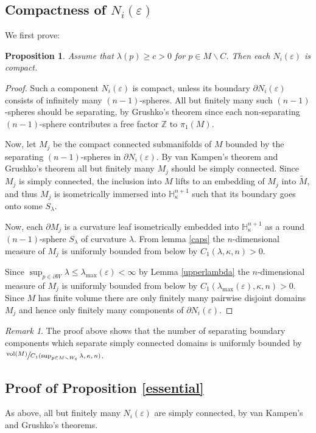 \documentclass[10pt]{amsart}
\let\moins\smallsetminus
\DeclareMathOperator{\vol}{vol}
\newtheorem{proposition}[theorem]{Proposition}
\theoremstyle{definition}
\theoremstyle{remark}
\newtheorem{remark}[theorem]{Remark}
\numberwithin{equation}{section}
\begin{document}
\subsection{Compactness of $N_i(\varepsilon)$}
We first prove:
\begin{proposition}\label{compact}
Assume that $\lambda(p) \geq c >0$ for $p\in M\moins C$.
Then each $N_i(\varepsilon)$ is compact.
\end{proposition}
\begin{proof}
Such a component $N_i(\varepsilon)$ is compact, unless its boundary $\partial N_i(\varepsilon)$ consists of
infinitely many $(n-1)$-spheres.
All but finitely many such $(n-1)$-spheres should be separating, by
Grushko's theorem since each non-separating $(n-1)$-sphere contributes a free factor $\mathbb Z$
to $\pi_1(M)$.

Now, let $M_j$ be the compact connected submanifolds of $M$ bounded
by the separating $(n-1)$-spheres in $\partial N_i(\varepsilon)$. By van
Kampen's theorem and Grushko's theorem all but finitely many $M_j$
should be simply connected. Since $M_j$ is simply connected, the inclusion into $M$ lifts to
an embedding of $M_j$ into $\widetilde{M}$, and
thus $M_j$ is isometrically immersed into $\mathbb H_{\kappa}^{n+1}$ such that
its boundary goes onto some $S_{\lambda}$.

Now, each $\partial M_j$ is a
curvature leaf isometrically embedded
into $\mathbb H_{\kappa}^{n+1}$ as a round $(n-1)$-sphere $S_{\lambda}$
of curvature $\lambda$.
From lemma \ref{caps} the
$n$-dimensional measure of $M_j$ is uniformly bounded from below by
$C_1(\lambda,\kappa,n) >0$.

Since $\sup_{p\in \partial W}\lambda \leq \lambda_{\max}(\varepsilon) < \infty$ by Lemma \ref{upperlambda}
the $n$-dimensional measure of $M_j$ is uniformly bounded from below by
$C_1(\lambda_{\max}(\varepsilon),\kappa,n) >0$. Since $M$ has finite volume there are only
finitely many pairwise disjoint domains $M_j$ and hence only finitely many components of $\partial N_i(\varepsilon)$.
\end{proof}
\begin{remark}\label{separating}
The proof above shows that the
number of separating boundary components which separate
simply connected domains is uniformly bounded by
$\sfrac{\vol(M)}{C_1(\sup_{p\in M\moins W_{\varepsilon}}\lambda,\kappa,n)}$.
\end{remark}

\subsection{Proof of Proposition \ref{essential}}
As above, all but finitely many $N_i(\varepsilon)$ are simply connected, by van Kampen's and Grushko's theorems.
\end{document}

